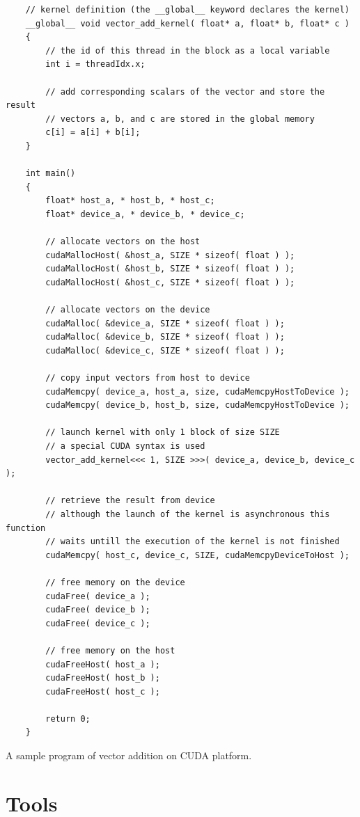 \documentclass[12pt,oneside]{fithesis2}
\begin{document}
\begin{listing}[h]
	\begin{verbatim}
	// kernel definition (the __global__ keyword declares the kernel)
	__global__ void vector_add_kernel( float* a, float* b, float* c )
	{
		// the id of this thread in the block as a local variable
		int i = threadIdx.x;
		
		// add corresponding scalars of the vector and store the result
		// vectors a, b, and c are stored in the global memory
		c[i] = a[i] + b[i];
	}
	
	int main()
	{
		float* host_a, * host_b, * host_c;
		float* device_a, * device_b, * device_c;
	
		// allocate vectors on the host
		cudaMallocHost( &host_a, SIZE * sizeof( float ) );
		cudaMallocHost( &host_b, SIZE * sizeof( float ) );
		cudaMallocHost( &host_c, SIZE * sizeof( float ) );
		
		// allocate vectors on the device
		cudaMalloc( &device_a, SIZE * sizeof( float ) );
		cudaMalloc( &device_b, SIZE * sizeof( float ) );
		cudaMalloc( &device_c, SIZE * sizeof( float ) );
		
		// copy input vectors from host to device
		cudaMemcpy( device_a, host_a, size, cudaMemcpyHostToDevice );
		cudaMemcpy( device_b, host_b, size, cudaMemcpyHostToDevice );
		
		// launch kernel with only 1 block of size SIZE
		// a special CUDA syntax is used
		vector_add_kernel<<< 1, SIZE >>>( device_a, device_b, device_c );
		
		// retrieve the result from device
		// although the launch of the kernel is asynchronous this function 
		// waits untill the execution of the kernel is not finished
		cudaMemcpy( host_c, device_c, SIZE, cudaMemcpyDeviceToHost );
		
		// free memory on the device
		cudaFree( device_a );
		cudaFree( device_b );
		cudaFree( device_c );
		
		// free memory on the host
		cudaFreeHost( host_a );
		cudaFreeHost( host_b );
		cudaFreeHost( host_c );
		
		return 0;
	}
	\end{verbatim}
	\caption{A sample program of vector addition on CUDA platform.}
	\label{listing:cuda_example}
\end{listing}

\section{Tools}
\end{document}
